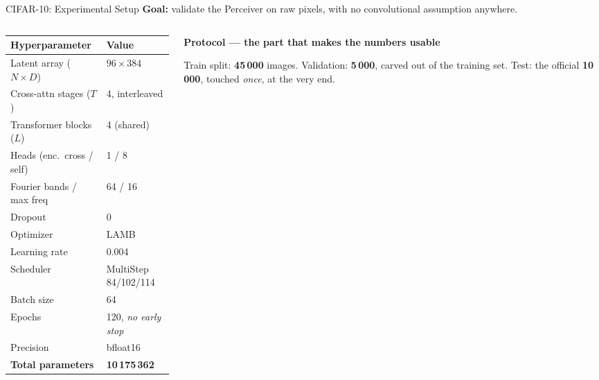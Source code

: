 \documentclass[aspectratio=169,11pt]{beamer}
\newcommand{\colhead}[1]{{\color{HeadBlue}\bfseries #1}\par\vspace{0.25em}}
\begin{document}


\begin{frame}[shrink=11]{CIFAR-10: Experimental Setup}
  \textbf{Goal:} validate the Perceiver on raw pixels, with no convolutional assumption anywhere.

  \vspace{0.3em}
  \begin{columns}[T]
    \begin{column}{0.46\textwidth}
      \begin{table}
        \centering\small
        \begin{tabular}{ll}
          \toprule
          \textbf{Hyperparameter} & \textbf{Value} \\
          \midrule
          Latent array ($N \times D$) & $96 \times 384$ \\
          Cross-attn stages ($T$) & 4, interleaved \\
          Transformer blocks ($L$) & 4 (shared) \\
          Heads (enc.\ cross / self) & 1 / 8 \\
          Fourier bands / max freq & 64 / 16 \\
          Dropout & 0 \\
          \midrule
          Optimizer & LAMB \\
          Learning rate & 0.004 \\
          Scheduler & MultiStep 84/102/114 \\
          Batch size & 64 \\
          Epochs & 120, \emph{no early stop} \\
          Precision & bfloat16 \\
          \midrule
          \textbf{Total parameters} & \textbf{10\,175\,362} \\
          \bottomrule
        \end{tabular}
      \end{table}
    \end{column}
    \begin{column}{0.50\textwidth}
      \colhead{Protocol --- the part that makes the numbers usable}
        \small
        Train split: \textbf{45\,000} images. Validation: \textbf{5\,000}, carved out of the training set. Test: the official \textbf{10\,000}, touched \emph{once}, at the very end.


\end{column}
\end{columns}
\end{frame}
\end{document}
